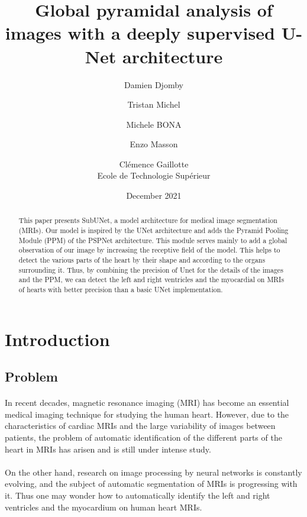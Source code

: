 \documentclass[english]{article}
\begin{document}

\title{Global pyramidal analysis of images with a deeply supervised U-Net architecture}

\author{
Damien Djomby \and Tristan Michel \and Michele BONA \and Enzo Masson \and Clémence Gaillotte \\
Ecole de Technologie Supérieur
}
\date{December 2021}

\maketitle
\normalsize


\begin{abstract}
This paper presents SubUNet, a model architecture for medical image segmentation (MRIs). Our model is inspired by the UNet architecture and adds the Pyramid Pooling Module (PPM) of the PSPNet architecture. This module serves mainly to add a global observation of our image by increasing the receptive field of the model. This helps to detect the various parts of the heart by their shape and according to the organs surrounding it. Thus, by combining the precision of Unet for the details of the images and the PPM, we can detect the left and right ventricles and the myocardial on MRIs of hearts with better precision than a basic UNet implementation.
\end{abstract}


\section{Introduction}  

\subsection{Problem}
\paragraph{}
In recent decades, magnetic resonance imaging (MRI) has become an essential medical imaging technique for studying the human heart. However, due to the characteristics of cardiac MRIs and the large variability of images between patients, the problem of automatic identification of the different parts of the heart in MRIs has arisen and is still under intense study.
\paragraph{}
On the other hand, research on image processing by neural networks is constantly evolving, and the subject of automatic segmentation of MRIs is progressing with it. Thus one may wonder how to automatically identify the left and right ventricles and the myocardium on human heart MRIs.
\end{document}
